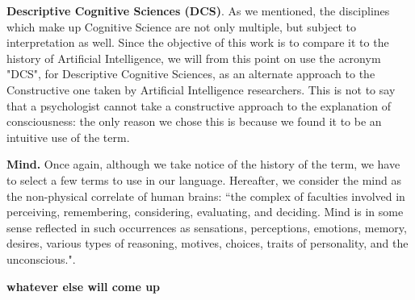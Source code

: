 \documentclass[../main.tex]{subfiles}
\begin{document}
\vspace{5pt}
\textbf{Descriptive Cognitive Sciences (DCS)}. As we mentioned, the disciplines which make up Cognitive Science are not only multiple, but subject to interpretation as well. Since the objective of this work is to compare it to the history of Artificial Intelligence, we will from this point on use the acronym "DCS", for Descriptive Cognitive Sciences, as an alternate approach to the Constructive one taken by Artificial Intelligence researchers. This is not to say that a psychologist cannot take a constructive approach to the explanation of consciousness: the only reason we chose this is because we found it to be an intuitive use of the term.

\vspace{5pt}
\textbf{Mind.} Once again, although we take notice of the history of the term, we have to select a few terms to use in our language. Hereafter, we consider the mind as the non-physical correlate of human brains: ``the complex of faculties involved in perceiving, remembering, considering, evaluating, and deciding. Mind is in some sense reflected in such occurrences as sensations, perceptions, emotions, memory, desires, various types of reasoning, motives, choices, traits of personality, and the unconscious."\cite{Mind}.

\vspace{5pt}
\textbf{whatever else will come up}
\end{document}
